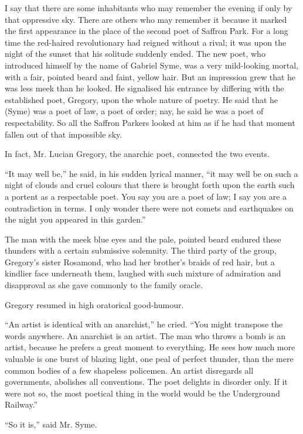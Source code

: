 \documentclass{book}
\begin{document}
I say that there are some inhabitants who may remember the evening if only by that oppressive sky. There are others who may remember it because it marked the first appearance in the place of the second poet of Saffron Park. For a long time the red-haired revolutionary had reigned without a rival; it was upon the night of the sunset that his solitude suddenly ended. The new poet, who introduced himself by the name of Gabriel Syme, was a very mild-looking mortal, with a fair, pointed beard and faint, yellow hair. But an impression grew that he was less meek than he looked. He signalised his entrance by differing with the established poet, Gregory, upon the whole nature of poetry. He said that he (Syme) was a poet of law, a poet of order; nay, he said he was a poet of respectability. So all the Saffron Parkers looked at him as if he had that moment fallen out of that impossible sky.

In fact, Mr. Lucian Gregory, the anarchic poet, connected the two events.

“It may well be,” he said, in his sudden lyrical manner, “it may well be on such a night of clouds and cruel colours that there is brought forth upon the earth such a portent as a respectable poet. You say you are a poet of law; I say you are a contradiction in terms. I only wonder there were not comets and earthquakes on the night you appeared in this garden.”

The man with the meek blue eyes and the pale, pointed beard endured these thunders with a certain submissive solemnity. The third party of the group, Gregory’s sister Rosamond, who had her brother’s braids of red hair, but a kindlier face underneath them, laughed with such mixture of admiration and disapproval as she gave commonly to the family oracle.

Gregory resumed in high oratorical good-humour.

“An artist is identical with an anarchist,” he cried. “You might transpose the words anywhere. An anarchist is an artist. The man who throws a bomb is an artist, because he prefers a great moment to everything. He sees how much more valuable is one burst of blazing light, one peal of perfect thunder, than the mere common bodies of a few shapeless policemen. An artist disregards all governments, abolishes all conventions. The poet delights in disorder only. If it were not so, the most poetical thing in the world would be the Underground Railway.”

“So it is,” said Mr. Syme.
\end{document}

